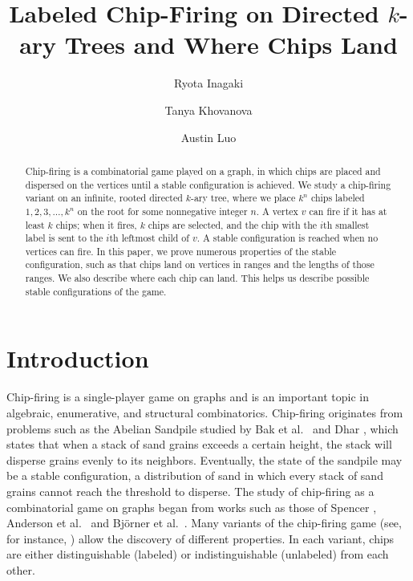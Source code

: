 \documentclass[11pt]{article}
\title{Labeled Chip-Firing on Directed $k$-ary Trees and Where Chips Land}
\author{Ryota Inagaki \and Tanya Khovanova \and Austin Luo}
\date{}
\theoremstyle{definition}
\theoremstyle{remark}
\begin{document}
\maketitle

\begin{abstract}
    Chip-firing is a combinatorial game played on a graph, in which chips are placed and dispersed on the vertices until a stable configuration is achieved. We study a chip-firing variant on an infinite, rooted directed $k$-ary tree, where we place $k^n$ chips labeled $1,2,3,\dots, k^n$ on the root for some nonnegative integer $n$. A vertex $v$ can fire if it has at least $k$ chips; when it fires, $k$ chips are selected, and the chip with the $i$th smallest label is sent to the $i$th leftmost child of $v$. A stable configuration is reached when no vertices can fire. In this paper, we prove numerous properties of the stable configuration, such as that chips land on vertices in ranges and the lengths of those ranges. We also describe where each chip can land. This helps us describe possible stable configurations of the game.
\end{abstract}

\renewcommand{\thefootnote}{\fnsymbol{footnote}} 



\section{Introduction}
Chip-firing is a single-player game on graphs and is an important topic in algebraic, enumerative, and structural combinatorics. Chip-firing originates from problems such as the Abelian Sandpile studied by Bak et al.~\cite{PhysRevLett} and Dhar \cite{dhar1999abelian}, which states that when a stack of sand grains exceeds a certain height, the stack will disperse grains evenly to its neighbors. Eventually, the state of the sandpile may be a stable configuration, a distribution of sand in which every stack of sand grains cannot reach the threshold to disperse. The study of chip-firing as a combinatorial game on graphs began from works such as those of Spencer \cite{MR856644}, Anderson et al.~\cite{zbMATH04135751} and Bj\"orner et al.~\cite{MR1120415}. Many variants of the chip-firing game (see, for instance, \cite{MR4486679, MR3311336, MR3504984}) allow the discovery of different properties. In each variant, chips are either distinguishable (labeled) or indistinguishable (unlabeled) from each other. 
\end{document}
